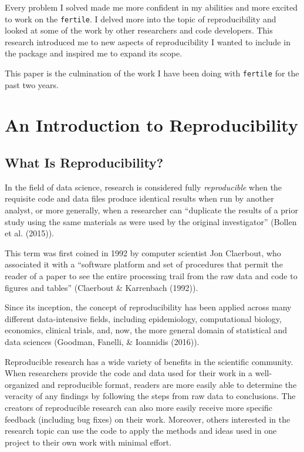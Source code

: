 \documentclass[12pt,twoside]{reedthesis}
\begin{document}
Every problem I solved made me more confident in my abilities and more
excited to work on the \texttt{fertile}. I delved more into the topic of
reproducibility and looked at some of the work by other researchers and
code developers. This research introduced me to new aspects of
reproducibility I wanted to include in the package and inspired me to
expand its scope.

This paper is the culmination of the work I have been doing with
\texttt{fertile} for the past two years.

\chapter{An Introduction to Reproducibility}\label{reproducibility}

\section{What Is Reproducibility?}\label{what-is-reproducibility}

In the field of data science, research is considered fully
\emph{reproducible} when the requisite code and data files produce
identical results when run by another analyst, or more generally, when a
researcher can ``duplicate the results of a prior study using the same
materials as were used by the original investigator'' (Bollen et al.
(2015)).

This term was first coined in 1992 by computer scientist Jon Claerbout,
who associated it with a ``software platform and set of procedures that
permit the reader of a paper to see the entire processing trail from the
raw data and code to figures and tables'' (Claerbout \& Karrenbach
(1992)).

Since its inception, the concept of reproducibility has been applied
across many different data-intensive fields, including epidemiology,
computational biology, economics, clinical trials, and, now, the more
general domain of statistical and data sciences (Goodman, Fanelli, \&
Ioannidis (2016)).

Reproducible research has a wide variety of benefits in the scientific
community. When researchers provide the code and data used for their
work in a well-organized and reproducible format, readers are more
easily able to determine the veracity of any findings by following the
steps from raw data to conclusions. The creators of reproducible
research can also more easily receive more specific feedback (including
bug fixes) on their work. Moreover, others interested in the research
topic can use the code to apply the methods and ideas used in one
project to their own work with minimal effort.
\end{document}
